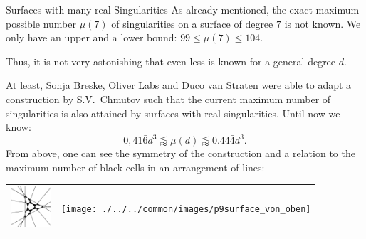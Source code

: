 \begin{surferPage}[216 Singularities]{Surfaces with many real Singularities}
    As already mentioned, the exact maximum possible number
    $\mu(7)$ of singularities on a surface of degree $7$ is not known.
    We only have an upper and a lower bound: $99\le \mu(7) \le 104$. 


    Thus, it is not very astonishing that even less is known for a general degree $d$. 

    At least, Sonja Breske, Oliver Labs and Duco van Straten were able to adapt a
    construction by S.V.\ Chmutov such that the current maximum
    number of singularities is also attained by surfaces with real
    singularities. 
    Until now we know:
    \[0,41\bar{6}d^3 \lessapprox \mu(d) \lessapprox 0.44\bar{4} d^3.\]
     From above, one can see the symmetry of the construction and a relation to
    the maximum number of black cells in an arrangement of lines:
    \begin{center}
      \begin{tabular}{c@{\qquad}c}
        \includegraphics[height=1.5cm]{./../../common/images/vielesing.pdf}
        &
        \texttt{[image: ./../../common/images/p9surface\_von\_oben]}
      \end{tabular}
    \end{center}
\end{surferPage}
